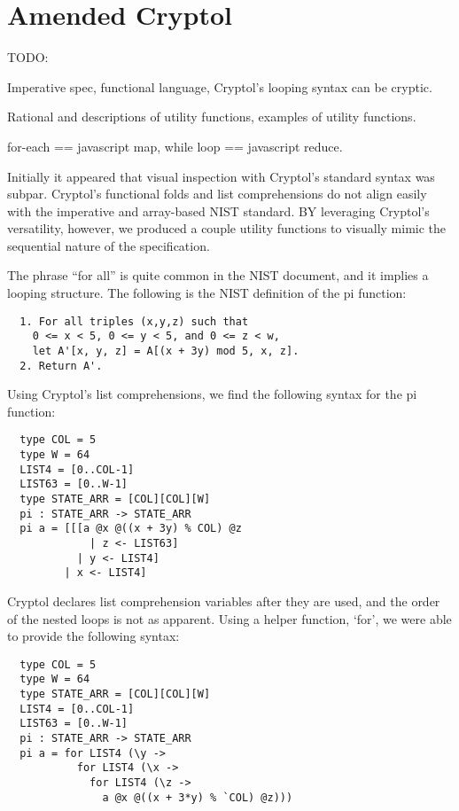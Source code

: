 \section{Amended Cryptol}\label{sec:amended}
TODO:

Imperative spec, functional language, Cryptol's looping syntax can be cryptic.

Rational and descriptions of utility functions, examples of utility functions.

for-each == javascript map, while loop == javascript reduce.

Initially it appeared that visual inspection with Cryptol’s standard syntax was subpar.
Cryptol’s functional folds and list comprehensions do not align easily with the imperative 
and array-based NIST standard. BY leveraging Cryptol’s versatility, however, we produced a couple 
utility functions to visually mimic the sequential nature of the specification. 

The phrase “for all” is quite common in the NIST document, and it implies a looping structure. 
The following is the NIST definition of the pi function:
\begin{verbatim}
  1. For all triples (x,y,z) such that 
    0 <= x < 5, 0 <= y < 5, and 0 <= z < w,
    let A'[x, y, z] = A[(x + 3y) mod 5, x, z].
  2. Return A'.
\end{verbatim}
    
Using Cryptol's list comprehensions, we find the following syntax for the pi function:
\begin{verbatim}
  type COL = 5 
  type W = 64
  LIST4 = [0..COL-1]
  LIST63 = [0..W-1]
  type STATE_ARR = [COL][COL][W]
  pi : STATE_ARR -> STATE_ARR
  pi a = [[[a @x @((x + 3y) % COL) @z 
             | z <- LIST63] 
           | y <- LIST4] 
         | x <- LIST4]
\end{verbatim}

Cryptol declares list comprehension variables after they are used, and the order of the
nested loops is not as apparent. Using a helper function, ‘for’, we were able to provide
the following syntax:

\begin{verbatim}
  type COL = 5 
  type W = 64
  type STATE_ARR = [COL][COL][W]
  LIST4 = [0..COL-1]
  LIST63 = [0..W-1]
  pi : STATE_ARR -> STATE_ARR
  pi a = for LIST4 (\y ->
           for LIST4 (\x -> 
             for LIST4 (\z -> 
               a @x @((x + 3*y) % `COL) @z)))
\end{verbatim}

